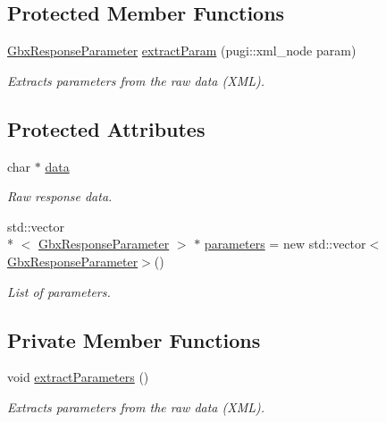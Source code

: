 \subsection*{Protected Member Functions}
\begin{DoxyCompactItemize}
\item 
\hyperlink{classGbxResponseParameter}{Gbx\-Response\-Parameter} \hyperlink{classGbxServerResponse_a22433a652ce9d4c7e9b834aa60c93c37}{extract\-Param} (pugi\-::xml\-\_\-node param)
\begin{DoxyCompactList}\small\item\em Extracts parameters from the raw data (X\-M\-L). \end{DoxyCompactList}\end{DoxyCompactItemize}
\subsection*{Protected Attributes}
\begin{DoxyCompactItemize}
\item 
char $\ast$ \hyperlink{classGbxServerResponse_aeee1fc539a5881334926e5c6789581bd}{data}
\begin{DoxyCompactList}\small\item\em Raw response data. \end{DoxyCompactList}\item 
std\-::vector\\*
$<$ \hyperlink{classGbxResponseParameter}{Gbx\-Response\-Parameter} $>$ $\ast$ \hyperlink{classGbxServerResponse_ad6fef5319c4da9461f4cd0d72d8b5ee8}{parameters} = new std\-::vector$<$\hyperlink{classGbxResponseParameter}{Gbx\-Response\-Parameter}$>$()
\begin{DoxyCompactList}\small\item\em List of parameters. \end{DoxyCompactList}\end{DoxyCompactItemize}
\subsection*{Private Member Functions}
\begin{DoxyCompactItemize}
\item 
void \hyperlink{classGbxCallBack_a0a9b9db5ebdc8040058b542fb51283d7}{extract\-Parameters} ()
\begin{DoxyCompactList}\small\item\em Extracts parameters from the raw data (X\-M\-L). \end{DoxyCompactList}\end{DoxyCompactItemize}

